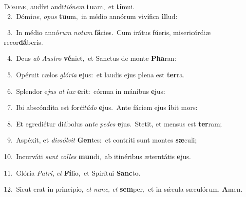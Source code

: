 \lettrine{\initial\textcolor{\initialcolor}{D}}{ómine,} audívi audi\-\textit{ti}\-\textit{ó}\textit{nem} \textbf{tu}\-am,~\star et \textbf{tí}\-mui.\\
{\numbfont\textcolor{\numbcolor}{~2.}}~Dómi\-\textit{ne}\-, \textit{o}\-\textit{pus} \textbf{tu}\-um,~\star in médio annórum vivífica \textbf{il}\-lud:\par
{\numbfont\textcolor{\numbcolor}{~3.}}~In médio annó\textit{rum} \textit{no}\-\textit{tum} \textbf{fá}\-cies.~\star Cum irátus fúeris, misericórdiæ recor\-\textbf{dá}\-beris.\par
{\numbfont\textcolor{\numbcolor}{~4.}}~Deus \textit{ab} \textit{Aus}\-\textit{tro} \textbf{vé}\-niet,~\star et Sanctus de monte \textbf{Pha}\-ran:\par
{\numbfont\textcolor{\numbcolor}{~5.}}~Opéruit cælos \textit{gló}\-\textit{ri}\textit{a} \textbf{e}\-jus:~\star et laudis ejus plena est \textbf{ter}\-ra.\par
{\numbfont\textcolor{\numbcolor}{~6.}}~Splendor e\textit{jus} \textit{ut} \textit{lux} \textbf{e}\-rit:~\star córnua in mánibus \textbf{e}\-jus:\par
{\numbfont\textcolor{\numbcolor}{~7.}}~Ibi abscóndita est for\-\textit{ti}\-\textit{tú}\textit{do} \textbf{e}\-jus.~\star Ante fáciem ejus \textbf{i}\-bit mors:\par
{\numbfont\textcolor{\numbcolor}{~8.}}~Et egrediétur diábolus an\textit{te} \textit{pe}\-\textit{des} \textbf{e}\-jus.~\star Stetit, et mensus est \textbf{ter}\-ram;\par
{\numbfont\textcolor{\numbcolor}{~9.}}~Aspéxit, et \textit{dis}\-\textit{sól}\textit{vit} \textbf{Gen}\-tes:~\star et contríti sunt montes \textbf{sæ}\-culi;\par
{\numbfont\textcolor{\numbcolor}{10.}}~Incurváti \textit{sunt} \textit{col}\-\textit{les} \textbf{mun}\-di,~\star ab itinéribus æterntátis \textbf{e}\-jus.\par
{\numbfont\textcolor{\numbcolor}{11.}}~Glória \textit{Pa}\-\textit{tri}, \textit{et} \textbf{Fí}\-lio,~\star et Spirítui \textbf{Sanc}\-to.\par
{\numbfont\textcolor{\numbcolor}{12.}}~Sicut erat in princípio, \textit{et} \textit{nunc}\-, \textit{et} \textbf{sem}\-per,~\star et in sǽcula sæculórum. \textbf{A}\-men.\par
